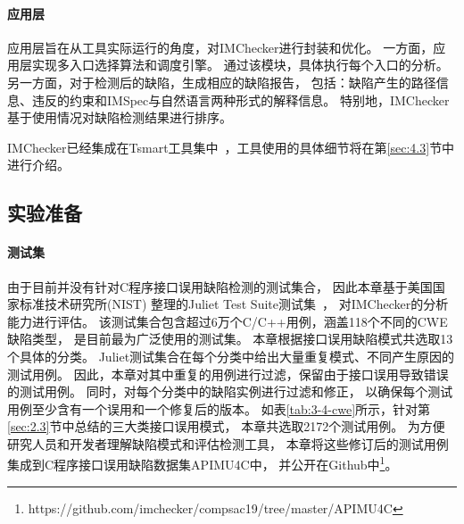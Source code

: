 \paragraph{应用层}
应用层旨在从工具实际运行的角度，对IMChecker进行封装和优化。
一方面，应用层实现多入口选择算法和调度引擎。
通过该模块，具体执行每个入口的分析。
另一方面，对于检测后的缺陷，生成相应的缺陷报告，
包括：缺陷产生的路径信息、违反的约束和IMSpec与自然语言两种形式的解释信息。
特别地，IMChecker基于使用情况对缺陷检测结果进行排序。

IMChecker已经集成在Tsmart工具集中~\cite{tsmart}，工具使用的具体细节将在第\ref{sec:4.3}节中进行介绍。

\subsection{实验准备}



\paragraph{测试集} 
由于目前并没有针对C程序接口误用缺陷检测的测试集合，
因此本章基于美国国家标准技术研究所(NIST) 整理的Juliet Test Suite测试集~\cite{juliet}，
对IMChecker的分析能力进行评估。
该测试集合包含超过6万个C/C++用例，涵盖118个不同的CWE缺陷类型，
是目前最为广泛使用的测试集。
本章根据接口误用缺陷模式共选取13个具体的分类。
Juliet测试集合在每个分类中给出大量重复模式、不同产生原因的测试用例。
因此，本章对其中重复的用例进行过滤，保留由于接口误用导致错误的测试用例。
同时，对每个分类中的缺陷实例进行过滤和修正，
以确保每个测试用例至少含有一个误用和一个修复后的版本。
如表\ref{tab:3-4-cwe}所示，针对第\ref{sec:2.3}节中总结的三大类接口误用模式，
本章共选取2172个测试用例。
为方便研究人员和开发者理解缺陷模式和评估检测工具，
本章将这些修订后的测试用例集成到C程序接口误用缺陷数据集APIMU4C中，
并公开在Github中\footnote{https://github.com/imchecker/compsac19/tree/master/APIMU4C}。


